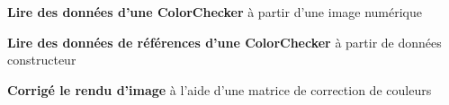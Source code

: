 \item \textbf{Lire des données d'une ColorChecker} à partir d'une image numérique
\item \textbf{Lire des données de références d'une ColorChecker} à partir de données constructeur
\item \textbf{Corrigé le rendu d'image} à l'aide d'une matrice de correction de couleurs